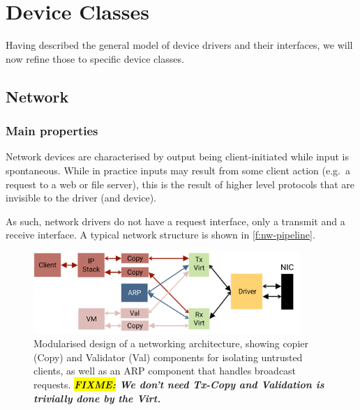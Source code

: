 \documentclass[a4paper,12pt]{report}
\newcommand{\FIXME}[1]{\textbf{\textsl{\colorbox{yellow}{FIXME:} #1}}}
\newcommand{\FIXME}[1]{\relax}
\begin{document}
\chapter{Device Classes}\label{s:classes}

Having described the general model of device drivers and their
interfaces, we will now refine those to specific device classes.


\section{Network}\label{s:cl-nw}

\subsection{Main properties}

Network devices are characterised by output being client-initiated
while input is spontaneous. While in practice inputs may result
from some client action (e.g.\ a request to a web or file server), this
is the result of higher level protocols that are invisible to the
driver (and device).

As such, network drivers do not have a request interface, only a
transmit and a receive interface. A typical network structure is shown
in \autoref{f:nw-pipeline}.

\begin{figure}[ht]
  \centering
  \includegraphics[width=0.9\textwidth]{pipeline-nw}
  \caption[Modularised design of a networking
  architecture.]{Modularised design of a networking architecture,
    showing
    copier (Copy) and Validator (Val) components for isolating
    untrusted clients, as well as an ARP component that handles
    broadcast requests. \FIXME{We don't need Tx-Copy and Validation is
    trivially done by the Virt.}}
  \label{f:nw-pipeline}
\end{figure}
\end{document}
